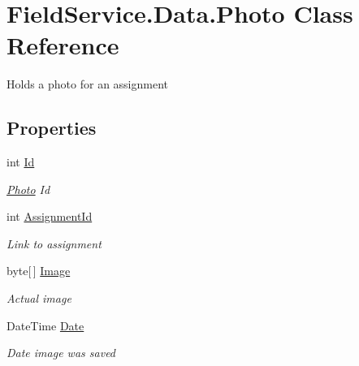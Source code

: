 \hypertarget{class_field_service_1_1_data_1_1_photo}{\section{Field\+Service.\+Data.\+Photo Class Reference}
\label{class_field_service_1_1_data_1_1_photo}
}


Holds a photo for an assignment  


\subsection*{Properties}
\begin{DoxyCompactItemize}
\item 
int \hyperlink{class_field_service_1_1_data_1_1_photo_a42745ec1f6ca35ea720f9c83f8823cda}{Id}
\begin{DoxyCompactList}\small\item\em \hyperlink{class_field_service_1_1_data_1_1_photo}{Photo} Id \end{DoxyCompactList}\item 
int \hyperlink{class_field_service_1_1_data_1_1_photo_aad1924d5c631bd0f7ad25e3f2625c806}{Assignment\+Id}
\begin{DoxyCompactList}\small\item\em Link to assignment \end{DoxyCompactList}\item 
byte\mbox{[}$\,$\mbox{]} \hyperlink{class_field_service_1_1_data_1_1_photo_a9569a230af280d0f6a1981b3ae052725}{Image}
\begin{DoxyCompactList}\small\item\em Actual image \end{DoxyCompactList}\item 
Date\+Time \hyperlink{class_field_service_1_1_data_1_1_photo_a2f0b36e2a1b4829bf033140310fdc99d}{Date}
\begin{DoxyCompactList}\small\item\em Date image was saved \end{DoxyCompactList}\item 

\end{DoxyCompactItemize}
